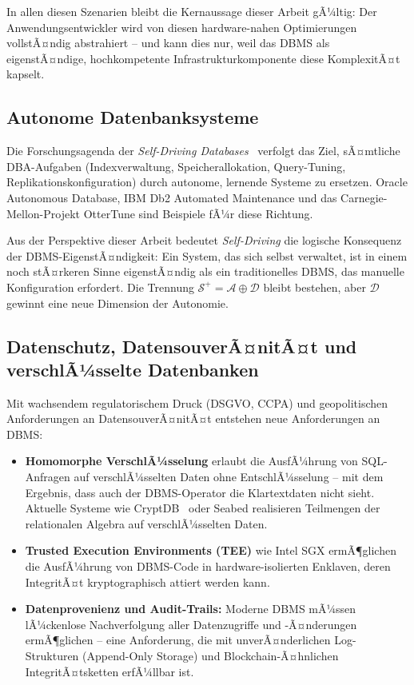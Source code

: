 ﻿\documentclass[a4paper,12pt]{article}
\theoremstyle{definition}
\begin{document}
In allen diesen Szenarien bleibt die Kernaussage dieser Arbeit gÃ¼ltig: Der Anwendungsentwickler wird von diesen hardware-nahen Optimierungen vollstÃ¤ndig abstrahiert -- und kann dies nur, weil das DBMS als eigenstÃ¤ndige, hochkompetente Infrastrukturkomponente diese KomplexitÃ¤t kapselt.

\subsection{Autonome Datenbanksysteme}

Die Forschungsagenda der \emph{Self-Driving Databases}~\cite{pavlo2017selfdriving} verfolgt das Ziel, sÃ¤mtliche DBA-Aufgaben (Indexverwaltung, Speicherallokation, Query-Tuning, Replikationskonfiguration) durch autonome, lernende Systeme zu ersetzen. Oracle Autonomous Database, IBM Db2 Automated Maintenance und das Carnegie-Mellon-Projekt OtterTune sind Beispiele fÃ¼r diese Richtung.

Aus der Perspektive dieser Arbeit bedeutet \emph{Self-Driving} die logische Konsequenz der DBMS-EigenstÃ¤ndigkeit: Ein System, das sich selbst verwaltet, ist in einem noch stÃ¤rkeren Sinne eigenstÃ¤ndig als ein traditionelles DBMS, das manuelle Konfiguration erfordert. Die Trennung $\mathcal{S}^+ = \mathcal{A} \oplus \mathcal{D}$ bleibt bestehen, aber $\mathcal{D}$ gewinnt eine neue Dimension der Autonomie.

\subsection{Datenschutz, DatensouverÃ¤nitÃ¤t und verschlÃ¼sselte Datenbanken}

Mit wachsendem regulatorischem Druck (DSGVO, CCPA) und geopolitischen Anforderungen an DatensouverÃ¤nitÃ¤t entstehen neue Anforderungen an DBMS:

\begin{itemize}
	\item \textbf{Homomorphe VerschlÃ¼sselung} erlaubt die AusfÃ¼hrung von SQL-Anfragen auf verschlÃ¼sselten Daten ohne EntschlÃ¼sselung -- mit dem Ergebnis, dass auch der DBMS-Operator die Klartextdaten nicht sieht. Aktuelle Systeme wie CryptDB~\cite{popa2011cryptdb} oder Seabed realisieren Teilmengen der relationalen Algebra auf verschlÃ¼sselten Daten.
	\item \textbf{Trusted Execution Environments (TEE)} wie Intel SGX ermÃ¶glichen die AusfÃ¼hrung von DBMS-Code in hardware-isolierten Enklaven, deren IntegritÃ¤t kryptographisch attiert werden kann.
	\item \textbf{Datenprovenienz und Audit-Trails:} Moderne DBMS mÃ¼ssen lÃ¼ckenlose Nachverfolgung aller Datenzugriffe und -Ã¤nderungen ermÃ¶glichen -- eine Anforderung, die mit unverÃ¤nderlichen Log-Strukturen (Append-Only Storage) und Blockchain-Ã¤hnlichen IntegritÃ¤tsketten erfÃ¼llbar ist.
\end{itemize}
\end{document}

